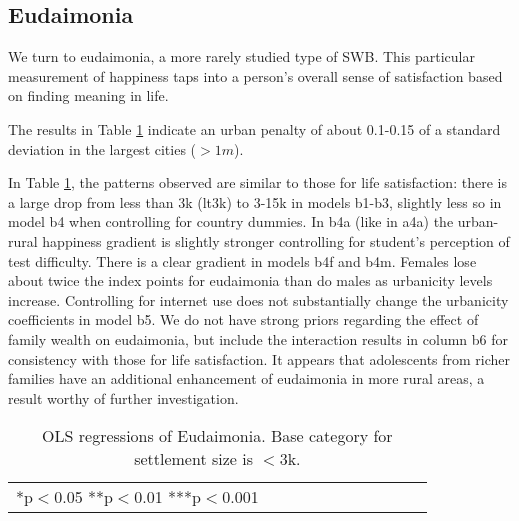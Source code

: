 \documentclass[11pt, letterpaper]{article}
\begin{document}
\begin{spacing}{1.9}
                                                       






\subsection*{Eudaimonia}

We turn to eudaimonia, a more rarely studied type of SWB. This particular measurement of happiness taps into a person's overall sense of satisfaction based on finding meaning in life. 

The results in Table \ref{regB} indicate an urban penalty of about 0.1-0.15 of a standard deviation in the largest cities ($>1m$).

 In Table \ref{regB}, the patterns observed are similar to those for life
 satisfaction: there is a large drop from less than 3k (lt3k) to 3-15k in models
 b1-b3, slightly less so
 in model b4 when controlling for country dummies. In b4a (like in a4a) the 
 urban-rural happiness gradient is slightly stronger controlling for student's perception
 of test difficulty. There is a clear gradient in
 models b4f and b4m. Females lose about twice the index points for eudaimonia
 than do males as urbanicity levels increase. 
Controlling for internet use does not substantially change  the urbanicity
coefficients in model b5. %
We do not
have strong priors regarding the effect of family wealth on eudaimonia, but include the interaction results in
column b6 %
 for consistency with those for life satisfaction. %
It appears that adolescents from richer families have an additional enhancement
of eudaimonia in more rural areas, a result worthy of further investigation.


\begin{table}[H]\centering\caption{OLS regressions of Eudaimonia. Base category for settlement size is $<$3k.} \label{regB} \begin{scriptsize} \begin{tabular}{p{1.6in}p{.5in}p{.5in}p{.5in}p{.5in}p{.5in}|p{.5in}p{.5in}|p{.5in}|p{.5in}p{.5in}p{.5 in}p{.5in}p{.5 in}}\hline  \hline\multicolumn{4}{l}{*p$<$0.05 **p$<$0.01 ***p$<$0.001} \end{tabular}\end{scriptsize}\end{table}




\end{spacing}
\end{document}
